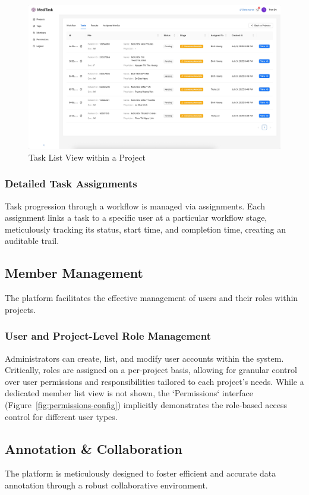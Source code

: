 \begin{figure}[h!]
    \centering
    \includegraphics[width=1\textwidth]{content/resources/features/tasks.png}
    \caption{Task List View within a Project}
    \label{fig:tasks-tab-1}
\end{figure}

\subsubsection{Detailed Task Assignments}
Task progression through a workflow is managed via assignments. Each assignment links a task to a specific user at a particular workflow stage, meticulously tracking its status, start time, and completion time, creating an auditable trail.

\subsection{Member Management}
The platform facilitates the effective management of users and their roles within projects.

\subsubsection{User and Project-Level Role Management}
Administrators can create, list, and modify user accounts within the system. Critically, roles are assigned on a per-project basis, allowing for granular control over user permissions and responsibilities tailored to each project's needs. While a dedicated member list view is not shown, the `Permissions` interface (Figure~\ref{fig:permissions-config}) implicitly demonstrates the role-based access control for different user types.

\subsection{Annotation \& Collaboration}
The platform is meticulously designed to foster efficient and accurate data annotation through a robust collaborative environment.

